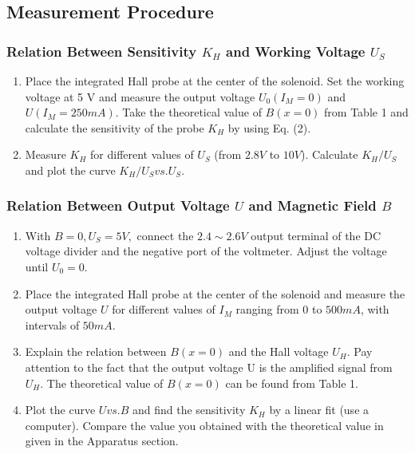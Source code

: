 \documentclass{article}
\begin{document}
\subsection{Measurement Procedure}

\subsubsection{Relation Between Sensitivity $ K_H $ and Working Voltage $ U_S $}
\begin{enumerate}
	\item Place the integrated Hall probe at the center of the solenoid. Set the working voltage at 5 V and measure the output voltage $ U_0 (I_M = 0) $ and $ U (I_M = 250 mA) $. Take the theoretical value of $ B(x = 0) $ from Table 1 and calculate the sensitivity of the probe $ K_H $ by using Eq. (2).\
	\item Measure $ K_H $ for different values of $ U_S $ (from $ 2.8 V $ to $ 10 V $). Calculate $ K_H/U_S $ and plot the curve $ K_H/U_S vs. U_S $.
\end{enumerate}
\subsubsection{Relation Between Output Voltage $ U $ and Magnetic Field $ B $}
\begin{enumerate}
	\item With $ B=0, U_S=5 V, $ connect the $ 2.4 \sim 2.6 V $ output terminal of the DC voltage divider and the negative port of the voltmeter. Adjust the voltage until $ U_0 = 0 $.
	\item Place the integrated Hall probe at the center of the solenoid and measure the output voltage $ U $ for different values of $ I_M $ ranging from 0 to $ 500 mA $, with intervals of $ 50 mA $.
	\item Explain the relation between $ B(x = 0) $ and the Hall voltage $ U_H $. Pay attention to the fact that the output voltage U is the amplified signal from $ U_H $. The theoretical value of $ B(x = 0) $ can be found from Table 1.
	\item Plot the curve $ U vs. B $ and find the sensitivity $ K_H $ by a linear fit (use a computer). Compare the value you obtained with the theoretical value in given in the Apparatus section.
\end{enumerate}
\end{document}
